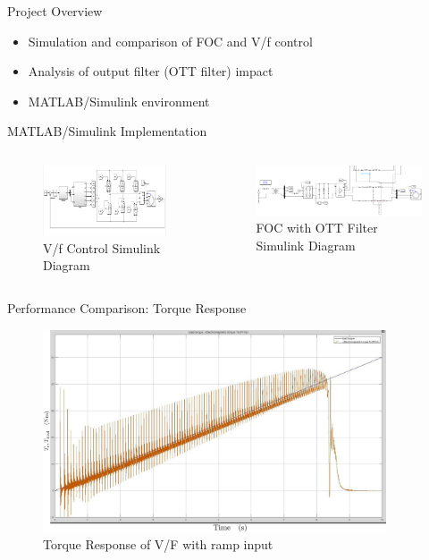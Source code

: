 \documentclass{beamer}
\begin{document}
\begin{frame}{Project Overview}
  \begin{itemize}
    \item Simulation and comparison of FOC and V/f control
    \item Analysis of output filter (OTT filter) impact
    \item MATLAB/Simulink environment
  \end{itemize}
\end{frame}

\begin{frame}{MATLAB/Simulink Implementation}
  \begin{columns}
    \begin{column}{0.5\textwidth}
      \begin{figure}
        \includegraphics[width=2in]{conference/vfSimulation.png} %
        \caption{V/f Control Simulink Diagram}
      \end{figure}
    \end{column}
    \begin{column}{0.5\textwidth}
      \begin{figure}
        \includegraphics[width=2in]{conference/matlab.png} %
        \caption{FOC with OTT Filter Simulink Diagram}
      \end{figure}
    \end{column}
  \end{columns}
\end{frame}


\begin{frame}{Performance Comparison: Torque Response}
  \begin{figure}
    \includegraphics[width=4in]{conference/60rpmTorque.jpeg} %
    \caption{Torque Response of V/F with ramp input}
  \end{figure}
\end{frame}
\end{document}
